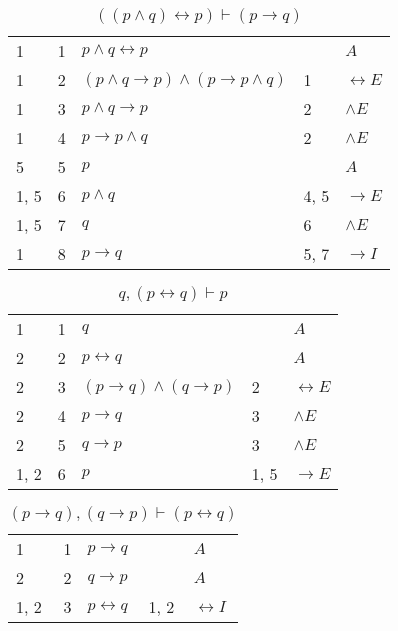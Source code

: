 \documentclass{article}
\begin{document}
\begin{table}[htbp]\caption*{$((p∧q)↔p) ⊢ (p→q)$}\centering\begin{tabular}{lrlll}
		{1} & 1 & $p∧q↔p$ & {} & $A$ \\
		{1} & 2 & $(p∧q→p)∧(p→p∧q)$ & {1} & $↔E$ \\
		{1} & 3 & $p∧q→p$ & {2} & $∧E$ \\
		{1} & 4 & $p→p∧q$ & {2} & $∧E$ \\
		{5} & 5 & $p$ & {} & $A$ \\
		{1, 5} & 6 & $p∧q$ & {4, 5} & $→E$ \\
		{1, 5} & 7 & $q$ & {6} & $∧E$ \\
		{1} & 8 & $p→q$ & {5, 7} & $→I$ \\
	\end{tabular}
\end{table}
\begin{table}[htbp]\caption*{$q,(p↔q) ⊢ p$}\centering\begin{tabular}{lrlll}
		{1} & 1 & $q$ & {} & $A$ \\
		{2} & 2 & $p↔q$ & {} & $A$ \\
		{2} & 3 & $(p→q)∧(q→p)$ & {2} & $↔E$ \\
		{2} & 4 & $p→q$ & {3} & $∧E$ \\
		{2} & 5 & $q→p$ & {3} & $∧E$ \\
		{1, 2} & 6 & $p$ & {1, 5} & $→E$ \\
	\end{tabular}
\end{table}
\begin{table}[htbp]\caption*{$(p→q),(q→p) ⊢ (p↔q)$}\centering\begin{tabular}{lrlll}
		{1} & 1 & $p→q$ & {} & $A$ \\
		{2} & 2 & $q→p$ & {} & $A$ \\
		{1, 2} & 3 & $p↔q$ & {1, 2} & $↔I$ \\
	\end{tabular}
\end{table}
\end{document}
